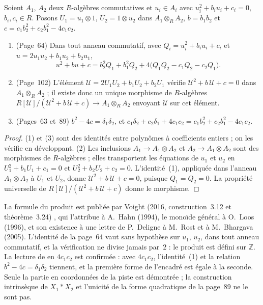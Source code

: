 \begin{enonce}
Soient $A_1$, $A_2$ deux $R$-algèbres commutatives et $u_i \in A_i$ avec $u_i^2 + b_iu_i + c_i = 0$, $b_i, c_i \in R$. Posons $U_1 = u_1 \otimes 1$, $U_2 = 1 \otimes u_2$ dans $A_1 \otimes_R A_2$, $b = b_1b_2$ et $c = c_1b_2^2 + c_2b_1^2 - 4c_1c_2$.
\begin{enumerate}
\item (Page~64) Dans tout anneau commutatif, avec $Q_i = u_i^2 + b_iu_i + c_i$ et $u = 2u_1u_2 + b_1u_2 + b_2u_1$,
\[ u^2 + bu + c = b_2^2Q_1 + b_1^2Q_2 + 4\bigl(Q_1Q_2 - c_1Q_2 - c_2Q_1\bigr). \]
\item (Page~102) L'élément $\mathcal U = 2U_1U_2 + b_1U_2 + b_2U_1$ vérifie $\mathcal U^2 + b\,\mathcal U + c = 0$ dans $A_1 \otimes_R A_2$ ; il existe donc un unique morphisme de $R$-algèbres $R[\mathcal U]/(\mathcal U^2 + b\,\mathcal U + c) \to A_1 \otimes_R A_2$ envoyant $\mathcal U$ sur cet élément.
\item (Pages~63 et~89) $b^2 - 4c = \delta_1\delta_2$, et $c_1\delta_2 + c_2\delta_1 + 4c_1c_2 = c_1b_2^2 + c_2b_1^2 - 4c_1c_2$.
\end{enumerate}
\end{enonce}

\begin{proof}
(1) et (3) sont des identités entre polynômes à coefficients entiers ; on les vérifie en développant. (2) Les inclusions $A_1 \to A_1 \otimes A_2$ et $A_2 \to A_1 \otimes A_2$ sont des morphismes de $R$-algèbres ; elles transportent les équations de $u_1$ et $u_2$ en $U_1^2 + b_1U_1 + c_1 = 0$ et $U_2^2 + b_2U_2 + c_2 = 0$. L'identité~(1), appliquée dans l'anneau $A_1 \otimes A_2$ à $U_1$ et $U_2$, donne $\mathcal U^2 + b\,\mathcal U + c = 0$, puisque $Q_1 = Q_2 = 0$. La propriété universelle de $R[\mathcal U]/(\mathcal U^2 + b\,\mathcal U + c)$ donne le morphisme.
\end{proof}

\begin{remarque}
La formule du produit est publiée par Voight (2016, construction~3.12 et théorème~3.24) \cite{voight2016}, qui l'attribue à A.~Hahn (1994), le monoïde général à O.~Loos (1996), et son existence à une lettre de P.~Deligne à M.~Rost et à M.~Bhargava (2005). L'identité de la page~64 vaut sans hypothèse sur $u_1$, $u_2$, dans tout anneau commutatif, et la vérification ne divise jamais par~$2$ : le produit est défini sur $\mathbb Z$. La lecture de  en $4c_1c_2$ est confirmée : avec $4c_1c_2$, l'identité~(1) et la relation $b^2 - 4c = \delta_1\delta_2$ tiennent, et la première forme de l'encadré est égale à la seconde. Seule la partie en coordonnées de la piste est démontrée ; la construction intrinsèque de $X_1 * X_2$ et l'unicité de la forme quadratique de la page~89 ne le sont pas.
\end{remarque}

